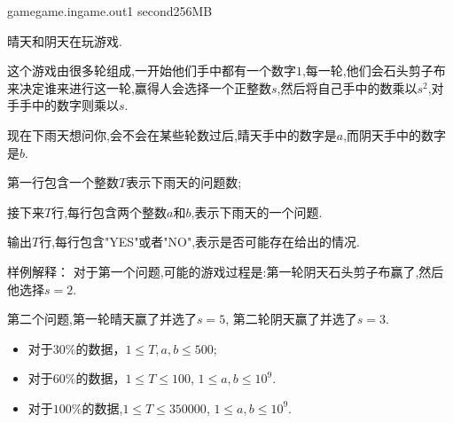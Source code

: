 \documentclass[11pt,a4paper,oneside]{article}
\begin{document}
\begin{problem}{game}{game.in}{game.out}{1 second}{256MB}

    晴天和阴天在玩游戏.
    
    这个游戏由很多轮组成,一开始他们手中都有一个数字$1$,每一轮,他们会石头剪子布来决定谁来进行这一轮,赢得人会选择一个正整数$s$,然后将自己手中的数乘以$s^2$,对手手中的数字则乘以$s$. 
    
    现在下雨天想问你,会不会在某些轮数过后,晴天手中的数字是$a$,而阴天手中的数字是$b$.
    
    \InputFile

	第一行包含一个整数$T$表示下雨天的问题数;
	
	接下来$T$行,每行包含两个整数$a$和$b$,表示下雨天的一个问题.

    \OutputFile

	输出$T$行,每行包含"YES"或者"NO",表示是否可能存在给出的情况.

    \Example

    \begin{example}
    \end{example}

	样例解释： 对于第一个问题,可能的游戏过程是:第一轮阴天石头剪子布赢了,然后他选择$s = 2$.
	
	第二个问题,第一轮晴天赢了并选了$s = 5$, 第二轮阴天赢了并选了$s = 3$.
	
    \Note
    
    \begin{itemize}
		\item 对于$30\%$的数据，$1 \leq T, a, b \leq 500$;
		\item 对于$60\%$的数据，$1 \leq T \leq 100$, $1 \leq a, b \leq 10^9$.
		\item 对于$100\%$的数据,$1 \leq T \leq 350000$, $1 \leq a, b \leq 10^9$.
    \end{itemize}

\end{problem}
\end{document}
